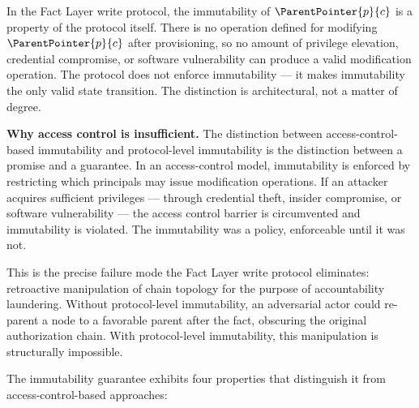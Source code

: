 In the Fact Layer write protocol, the immutability of $\ParentPointer{p}{c}$ is a property of the protocol itself. There is no operation defined for modifying $\ParentPointer{p}{c}$ after provisioning, so no amount of privilege elevation, credential compromise, or software vulnerability can produce a valid modification operation. The protocol does not enforce immutability --- it makes immutability the only valid state transition. The distinction is architectural, not a matter of degree.

\medskip
\noindent\textbf{Why access control is insufficient.} The distinction between access-control-based immutability and protocol-level immutability is the distinction between a promise and a guarantee. In an access-control model, immutability is enforced by restricting which principals may issue modification operations. If an attacker acquires sufficient privileges --- through credential theft, insider compromise, or software vulnerability --- the access control barrier is circumvented and immutability is violated. The immutability was a policy, enforceable until it was not.

This is the precise failure mode the Fact Layer write protocol eliminates: retroactive manipulation of chain topology for the purpose of accountability laundering. Without protocol-level immutability, an adversarial actor could re-parent a node to a favorable parent after the fact, obscuring the original authorization chain. With protocol-level immutability, this manipulation is structurally impossible.

The immutability guarantee exhibits four properties that distinguish it from access-control-based approaches:


